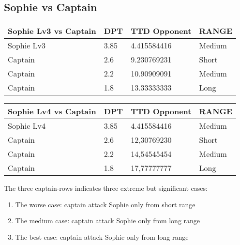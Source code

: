\subsection{Sophie vs Captain}
\begin{table}[H]
  \centering
\begin{tabular}{|l|l|l|l|}
\hline
\rowcolor[HTML]{C0C0C0} 
\textbf{Sophie Lv3 vs Captain} & \textbf{DPT} & \textbf{TTD Opponent} & \textbf{RANGE} \\ \hline
Sophie Lv3 & 3.85 & 4.415584416 & Medium \\ \hline
Captain & 2.6 & 9.230769231 & Short \\ \hline
Captain & 2.2 & 10.90909091 & Medium \\ \hline
Captain & 1.8 & 13.33333333 & Long \\ \hline
\end{tabular}
\end{table}
\begin{table}[H]
  \centering
\begin{tabular}{|l|l|l|l|}
\hline
\rowcolor[HTML]{C0C0C0} 
\textbf{Sophie Lv4 vs Captain} & \textbf{DPT} & \textbf{TTD Opponent} & \textbf{RANGE} \\ \hline
Sophie Lv4 & 3.85 & 4.415584416 & Medium \\ \hline
Captain & 2.6 & 12,30769230 & Short \\ \hline
Captain & 2.2 & 14,54545454 & Medium \\ \hline
Captain & 1.8 & 17,77777777 & Long \\ \hline
\end{tabular}
\end{table}
The three captain-rows indicates three extreme but significant cases:
\begin{enumerate}
\item The worse case: captain attack Sophie only from short range
\item The medium case: captain attack Sophie only  from long range
\item The best case: captain attack Sophie only  from long range
\end{enumerate}
